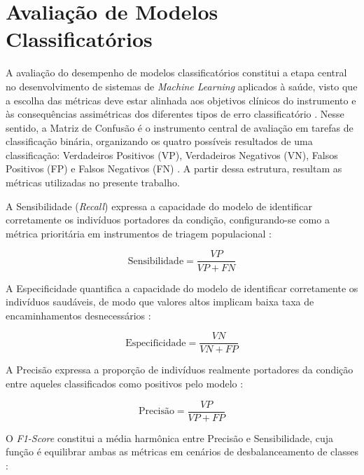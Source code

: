 \section{Avaliação de Modelos Classificatórios} \label{sec:avaliacao}

A avaliação do desempenho de modelos classificatórios constitui a etapa central no desenvolvimento de sistemas de \textit{Machine Learning} aplicados à saúde, visto que a escolha das métricas deve estar alinhada aos objetivos clínicos do instrumento e às consequências assimétricas dos diferentes tipos de erro classificatório \cite{Swaminathan2024}. Nesse sentido, a Matriz de Confusão é o instrumento central de avaliação em tarefas de classificação binária, organizando os quatro possíveis resultados de uma classificação: Verdadeiros Positivos (VP), Verdadeiros Negativos (VN), Falsos Positivos (FP) e Falsos Negativos (FN) \cite{Swaminathan2024}. A partir dessa estrutura, resultam as métricas utilizadas no presente trabalho.

A Sensibilidade (\textit{Recall}) expressa a capacidade do modelo de identificar corretamente os indivíduos portadores da condição, configurando-se como a métrica prioritária em instrumentos de triagem populacional \cite{Swaminathan2024}:

\begin{equation}
\text{Sensibilidade} = \frac{VP}{VP + FN}
\end{equation}

\noindent A Especificidade quantifica a capacidade do modelo de identificar corretamente os indivíduos saudáveis, de modo que valores altos implicam baixa taxa de encaminhamentos desnecessários \cite{Swaminathan2024}:

\begin{equation}\text{Especificidade} = \frac{VN}{VN + FP}
\end{equation}

\noindent A Precisão expressa a proporção de indivíduos realmente portadores da condição entre aqueles classificados como positivos pelo modelo \cite{Swaminathan2024}:

\begin{equation}\text{Precisão} = \frac{VP}{VP + FP}
\end{equation}

\noindent O \textit{F1-Score} constitui a média harmônica entre Precisão e Sensibilidade, cuja função é equilibrar ambas as métricas em cenários de desbalanceamento de classes \cite{Swaminathan2024}:

